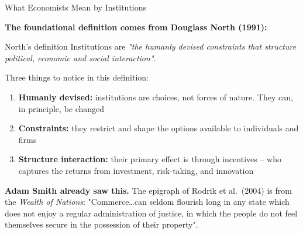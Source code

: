 \documentclass[10pt]{beamer}
\begin{document}
\begin{frame}[allowframebreaks]{What Economists Mean by Institutions}

\textbf{The foundational definition comes from Douglass North (1991):}


\begin{block}{North's definition}
Institutions are \emph{"the humanly devised constraints that structure political, economic and social interaction".}
\end{block}


Three things to notice in this definition:
\begin{enumerate}
\item \textbf{Humanly devised:} institutions are choices, not forces of nature. They can, in principle, be changed
\item \textbf{Constraints:} they restrict and shape the options available to individuals and firms
\item \textbf{Structure interaction:} their primary effect is through \alert{incentives} -- who captures the returns from investment, risk-taking, and innovation
\end{enumerate}


\textbf{Adam Smith already saw this.} The epigraph of Rodrik et al.\ (2004) is from the \emph{Wealth of Nations}: "Commerce\ldots can seldom flourish long in any state which does not enjoy a regular administration of justice, in which the people do not feel themselves secure in the possession of their property".
\end{frame}
\end{document}

